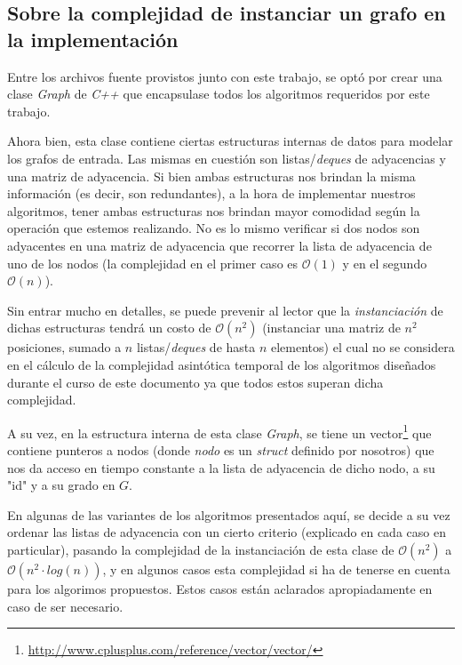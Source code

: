 \subsection*{Sobre la complejidad de instanciar un grafo en la implementaci\'on}\label{grafo:estructuras}
\par Entre los archivos fuente provistos junto con este trabajo, se opt\'o por
    crear una clase \emph{Graph} de \emph{C++} que encapsulase todos los algoritmos
    requeridos por este trabajo.

\par Ahora bien, esta clase contiene ciertas estructuras internas de datos
    para modelar los grafos de entrada. Las mismas en cuesti\'on son listas/\emph{deques}
    de adyacencias y una matriz de adyacencia. Si bien ambas estructuras nos
    brindan la misma informaci\'on (es decir, son redundantes), a la hora
    de implementar nuestros algoritmos, tener ambas estructuras nos brindan
    mayor comodidad seg\'un la operaci\'on que estemos realizando. No es lo
    mismo verificar si dos nodos son adyacentes en una matriz de adyacencia que
    recorrer la lista de adyacencia de uno de los nodos (la complejidad en
    el primer caso es $\mathcal O(1)$ y en el segundo $\mathcal O(n)$).

\par Sin entrar mucho en detalles, se puede prevenir al lector que la \emph{%
    instanciaci\'on} de dichas estructuras tendr\'a un costo de $\mathcal O%
    (n^2)$ (instanciar una matriz de $n^2$ posiciones, sumado a $n$ listas/\emph{deques} de
    hasta $n$ elementos) el cual no se considera en el c\'alculo de la complejidad
    asint\'otica temporal de los algoritmos dise\~nados durante el curso de este
    documento ya que todos estos superan dicha complejidad.

\par A su vez, en la estructura interna de esta clase \emph{Graph}, se tiene
    un vector\footnote{\url{http://www.cplusplus.com/reference/vector/vector/}}
    que contiene punteros a nodos (donde \emph{nodo} es un \emph{struct} definido
    por nosotros) que nos da acceso en tiempo constante a la lista de adyacencia
    de dicho nodo, a su "id" y a su grado en $G$.

\par En algunas de las variantes de los algoritmos presentados aqu\'i, se decide
    a su vez ordenar las listas de adyacencia con un cierto criterio (explicado
    en cada caso en particular), pasando la complejidad de la instanciaci\'on
    de esta clase de $\mathcal O(n^2)$ a $\mathcal O(n^2 \cdot log(n))$, y
    en algunos casos esta complejidad si ha de tenerse en cuenta para los algorimos
    propuestos. Estos casos est\'an aclarados apropiadamente en caso de ser
    necesario.

